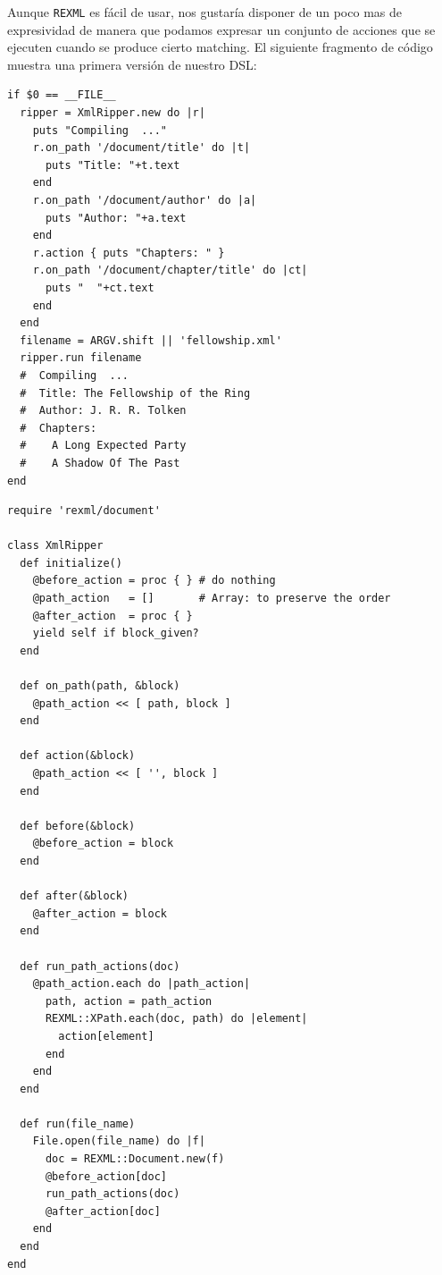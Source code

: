 \label{parrafo:dslxmlprimeraversion}

Aunque  \verb|REXML| es fácil de usar, nos gustaría disponer de un poco mas de expresividad de manera
que podamos expresar un conjunto de acciones
que se ejecuten cuando se produce cierto matching.
El siguiente fragmento de código muestra una primera versión de nuestro DSL:

\begin{verbatim}
if $0 == __FILE__
  ripper = XmlRipper.new do |r|
    puts "Compiling  ..."
    r.on_path '/document/title' do |t| 
      puts "Title: "+t.text 
    end
    r.on_path '/document/author' do |a| 
      puts "Author: "+a.text 
    end
    r.action { puts "Chapters: " }
    r.on_path '/document/chapter/title' do |ct| 
      puts "  "+ct.text 
    end
  end
  filename = ARGV.shift || 'fellowship.xml'
  ripper.run filename
  #  Compiling  ...
  #  Title: The Fellowship of the Ring
  #  Author: J. R. R. Tolken
  #  Chapters: 
  #    A Long Expected Party
  #    A Shadow Of The Past
end
\end{verbatim}


\begin{verbatim}
require 'rexml/document'

class XmlRipper
  def initialize()
    @before_action = proc { } # do nothing
    @path_action   = []       # Array: to preserve the order
    @after_action  = proc { }
    yield self if block_given?
  end

  def on_path(path, &block)
    @path_action << [ path, block ]
  end

  def action(&block)
    @path_action << [ '', block ]
  end

  def before(&block)
    @before_action = block
  end

  def after(&block)
    @after_action = block
  end

  def run_path_actions(doc)
    @path_action.each do |path_action|
      path, action = path_action
      REXML::XPath.each(doc, path) do |element|
        action[element]
      end
    end
  end

  def run(file_name)
    File.open(file_name) do |f|
      doc = REXML::Document.new(f)
      @before_action[doc]
      run_path_actions(doc)
      @after_action[doc]
    end
  end
end
\end{verbatim}



